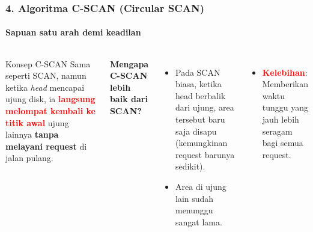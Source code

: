 \documentclass[t,aspectratio=169,xcolor=dvipsnames]{beamer}
\newcommand{\tem}[1]{\textbf{\textcolor{red}{#1}}}
\begin{document}
\begin{frame}
    \frametitle{4. Algoritma C-SCAN (Circular SCAN)}
    \framesubtitle{Sapuan satu arah demi keadilan}
    \small
    \begin{columns}[T]
        \begin{block}{Konsep C-SCAN}
            Sama seperti SCAN, namun ketika \textit{head} mencapai ujung disk, ia \tem{langsung melompat kembali ke titik awal} ujung lainnya \textbf{tanpa melayani request} di jalan pulang.
        \end{block}
        
        \textbf{Mengapa C-SCAN lebih baik dari SCAN?}
        \begin{itemize}
            \item Pada SCAN biasa, ketika head berbalik dari ujung, area tersebut baru saja disapu (kemungkinan request barunya sedikit).
            \item Area di ujung lain sudah menunggu sangat lama.
        \end{itemize}

        \vspace{0.2cm}
        \begin{itemize}
            \item \tem{Kelebihan}: Memberikan waktu tunggu yang jauh lebih seragam bagi semua request.
        \end{itemize}
    \end{columns}
\end{frame}
\end{document}
